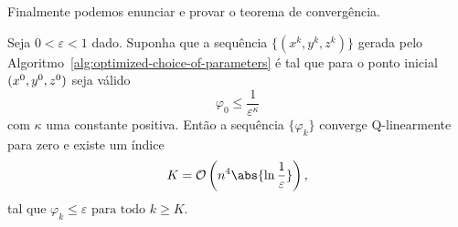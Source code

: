 







Finalmente podemos enunciar e provar o teorema de convergência. 


\begin{teo}
	\label{teo:alg-convergence-varphi} Seja $0 < \varepsilon <1$ dado. Suponha que a sequência $\{(x^{k},y^{k},z^{k})\}$ gerada pelo Algoritmo~\ref{alg:optimized-choice-of-parameters} é  tal que 
	para o ponto inicial $(x^0,y^0,z^0)$ seja válido	
	\begin{equation}
	\label{eq:varphi0-eps-kappa}
		\varphi_{0}\leq \dfrac{1}{\varepsilon^{\kappa}}
	\end{equation} 
	com  $\kappa$ uma constante positiva. Então a sequência $\{\varphi_{k}\}$ converge Q-linearmente para zero e existe um índice \[K =  \Oset\left(n^{4}\abs{\ln\frac{1}{\varepsilon}}\right),\] tal que 
	 $\varphi_{k}\leq \varepsilon \text{ para todo } k \geq K$.
	 
\end{teo}

